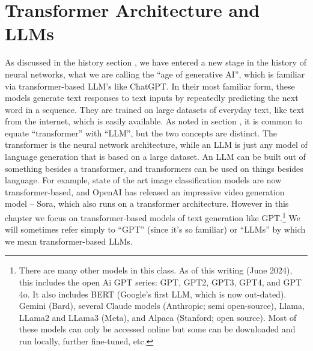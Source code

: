 \chapter{Transformer Architecture and LLMs}\label{ch_transformers}

As discussed in the history section , we have entered a new stage in the history of neural networks, what we are calling the ``age of generative AI'', which is familiar via transformer-based LLM's like ChatGPT.  In their most familiar form, these models generate text responses to text inputs by repeatedly predicting the next word in a sequence. They are trained on large datasets of everyday text, like text from the internet, which is easily available. As noted in section , it is common to equate ``transformer'' with ``LLM'', but the two concepts are distinct. The transformer is the neural network architecture, while an LLM is just any model of language generation that is based on a large dataset. An LLM can be built out of something besides a transformer, and transformers can be used on things besides language. For example, state of the art image classification models are now transformer-based, and OpenAI has released an impressive video generation model – Sora, which also runs on a transformer architecture. However in this chapter we focus on transformer-based models of text generation like GPT.\footnote{There are many other models in this class. As of this writing (June 2024), this includes the open Ai GPT series: GPT, GPT2, GPT3, GPT4, and GPT 4o.  It also  includes BERT (Google’s first LLM, which is now out-dated). Gemini  (Bard), several Claude models (Anthropic;  semi open-source), Llama, LLama2 and LLama3 (Meta), and Alpaca (Stanford; open source). Most of these models can only be accessed online but some can be downloaded and run locally, further fine-tuned, etc.} We will sometimes refer simply to ``GPT'' (since it's so familiar) or ``LLMs'' by which we mean transformer-based LLMs. 

